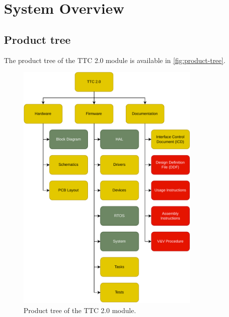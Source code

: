 %
%
%
%
%

%
%
%
%
%

\chapter{System Overview} \label{ch:system-overview}

\section{Product tree}

The product tree of the TTC 2.0 module is available in \autoref{fig:product-tree}.

\begin{figure}[!ht]
    \begin{center}
        \includegraphics[width=0.8\textwidth]{figures/product-tree.pdf}
        \caption{Product tree of the TTC 2.0 module.}
        \label{fig:product-tree}
    \end{center}
\end{figure}
